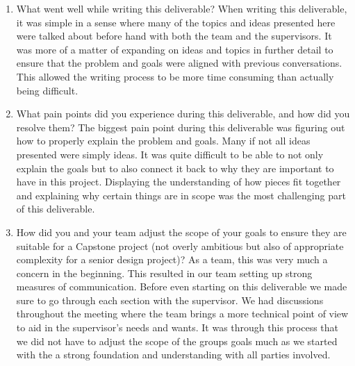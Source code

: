 \documentclass{article}
\begin{document}
\begin{enumerate}
    \item What went well while writing this deliverable? \newline \newline
        When writing this deliverable, it was simple in a sense where many of
        the topics and ideas presented here were talked about before hand with
        both the team and the supervisors. It was more of a matter of expanding
        on ideas and topics in further detail to ensure that the problem and
        goals were aligned with previous conversations. This allowed the writing
        process to be more time consuming than actually being difficult. 
    \item What pain points did you experience during this deliverable, and how
    did you resolve them? \newline \newline
        The biggest pain point during this deliverable was figuring out how to
        properly explain the problem and goals. Many if not all ideas presented
        were simply ideas. It was quite difficult to be able to not only explain
        the goals but to also connect it back to why they are important to have
        in this project. Displaying the understanding of how pieces fit together
        and explaining why certain things are in scope was the most challenging
        part of this deliverable. 
    \item How did you and your team adjust the scope of your goals to ensure
    they are suitable for a Capstone project (not overly ambitious but also of
    appropriate complexity for a senior design project)? \newline \newline
        As a team, this was very much a concern in the beginning. This resulted
        in our team setting up strong measures of communication. Before even
        starting on this deliverable we made sure to go through each section
        with the supervisor. We had discussions throughout the meeting where the
        team brings a more technical point of view to aid in the supervisor's
        needs and wants. It was through this process that we did not have to
        adjust the scope of the groups goals much as we started with the a
        strong foundation and understanding with all parties involved.  
\end{enumerate}  
\end{document}
